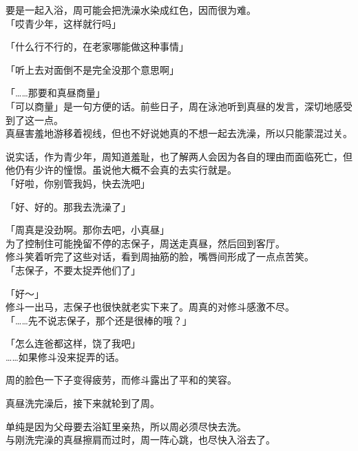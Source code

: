 要是一起入浴，周可能会把洗澡水染成红色，因而很为难。\\

「哎青少年，这样就行吗」

「什么行不行的，在老家哪能做这种事情」

「听上去对面倒不是完全没那个意思啊」

「……那要和真昼商量」\\

「可以商量」是一句方便的话。前些日子，周在泳池听到真昼的发言，深切地感受到了这一点。\\

真昼害羞地游移着视线，但也不好说她真的不想一起去洗澡，所以只能蒙混过关。

说实话，作为青少年，周知道羞耻，也了解两人会因为各自的理由而面临死亡，但他仍有少许的憧憬。虽说他大概不会真的去实行就是。\\

「好啦，你别管我妈，快去洗吧」

「好、好的。那我去洗澡了」

「周真是没劲啊。那你去吧，小真昼」\\

为了控制住可能挽留不停的志保子，周送走真昼，然后回到客厅。\\

修斗笑着听完了这些对话，看到周抽筋的脸，嘴唇间形成了一点点苦笑。\\

「志保子，不要太捉弄他们了」

「好～」\\

修斗一出马，志保子也很快就老实下来了。周真的对修斗感激不尽。\\

「……先不说志保子，那个还是很棒的哦？」

「怎么连爸都这样，饶了我吧」\\

……如果修斗没来捉弄的话。

周的脸色一下子变得疲劳，而修斗露出了平和的笑容。\\

\vspace{2\baselineskip}

真昼洗完澡后，接下来就轮到了周。

单纯是因为父母要去浴缸里亲热，所以周必须尽快去洗。\\

与刚洗完澡的真昼擦肩而过时，周一阵心跳，也尽快入浴去了。

